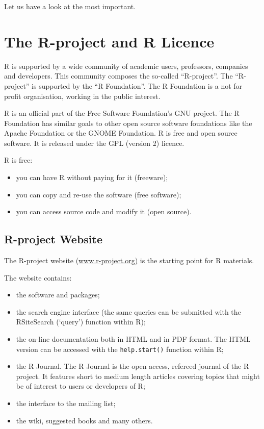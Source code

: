 \documentclass[]{book}
\providecommand{\tightlist}{%
  \setlength{\itemsep}{0pt}\setlength{\parskip}{0pt}}
\def\tightlist{}
\begin{document}
Let us have a look at the most important.

\section{The R-project and R Licence}\label{the-r-project-and-r-licence}

R is supported by a wide community of academic users, professors,
companies and developers. This community composes the so-called
``R-project''. The ``R-project'' is supported by the ``R Foundation''.
The R Foundation is a not for profit organisation, working in the public
interest.

R is an official part of the Free Software Foundation's GNU project. The
R Foundation has similar goals to other open source software foundations
like the Apache Foundation or the GNOME Foundation. R is free and open
source software. It is released under the GPL (version 2) licence.

R is free:

\begin{itemize}
\tightlist
\item
  you can have R without paying for it (freeware);
\item
  you can copy and re-use the software (free software);
\item
  you can access source code and modify it (open source).
\end{itemize}

\subsection{R-project Website}\label{r-project-website}

The R-project website
\href{http://www.r-project.org/}{(www.r-project.org)} is the starting
point for R materials.

The website contains:

\begin{itemize}
\tightlist
\item
  the software and packages;
\item
  the search engine interface (the same queries can be submitted with
  the RSiteSearch (`query') function within R);
\item
  the on-line documentation both in HTML and in PDF format. The HTML
  version can be accessed with the \texttt{help.start()} function within
  R;
\item
  the R Journal. The R Journal is the open access, refereed journal of
  the R project. It features short to medium length articles covering
  topics that might be of interest to users or developers of R;
\item
  the interface to the mailing list;
\item
  the wiki, suggested books and many others.
\end{itemize}
\end{document}
